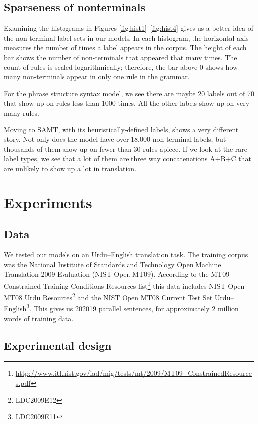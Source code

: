 \documentclass[a4paper]{article}
\begin{document}
\subsection{Sparseness of nonterminals}

Examining the histograms in Figures \ref{fig:hist1}--\ref{fig:hist4} gives us a better idea of the non-terminal label sets in our models. In each histogram, the horizontal axis measures the number of times a label appears in the corpus. The height of each bar shows the number of non-terminals that appeared that many times. The count of rules is scaled logarithmically; therefore, the bar above 0 shows how many non-terminals appear in only one rule in the grammar.

For the phrase structure syntax model, we see there are maybe 20 labels out of 70 that show up on rules less than 1000 times. All the other labels show up on very many rules.

Moving to SAMT, with its heuristically-defined labels, shows a very different story. Not only does the model have over 18,000 non-terminal labels, but thousands of them show up on fewer than 30 rules apiece. If we look at the rare label types, we see that a lot of them are three way concatenations A+B+C that are unlikely to show up a lot in translation. 

\section{Experiments}

\subsection{Data}

We tested our models on an Urdu--English translation task. The training corpus was the National Institute of Standards and Technology Open Machine Translation 2009 Evaluation (NIST Open MT09). According to the MT09 Constrained Training Conditions Resources list\footnote{\url{http://www.itl.nist.gov/iad/mig/tests/mt/2009/MT09_ConstrainedResources.pdf}} this data includes NIST Open MT08 Urdu Resources\footnote{LDC2009E12} and the NIST Open MT08 Current Test Set Urdu--English\footnote{LDC2009E11}. This gives us 202019 parallel sentences, for approximately 2 million words of training data.

\subsection{Experimental design}
\end{document}
